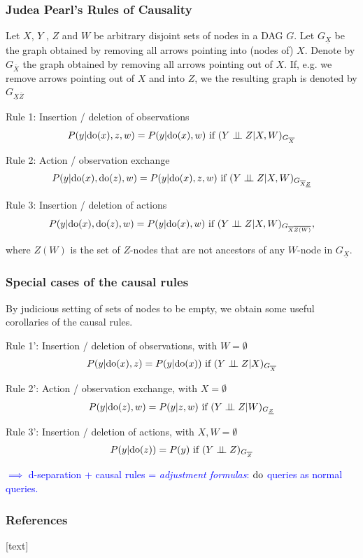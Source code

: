 \begin{frame}
\frametitle{Judea Pearl's Rules of Causality}

Let $X$, $Y$ , $Z$ and $W$ be arbitrary disjoint sets of nodes in a DAG $G$. Let $G_\underline{X}$ be the graph obtained by removing all arrows pointing into (nodes of) $X$.
Denote by $G_{\overline{X}}$ the graph obtained by removing all arrows pointing out of $X$. If, e.g. we remove arrows pointing out of $X$ and into $Z$, we the resulting graph is denoted by $G_{\underline{X} \overline{Z}}$

Rule 1: Insertion / deletion of observations
\begin{equation*}
P(y | \mathrm{do}(x), z, w) = P(y | \mathrm{do}(x), w) \textrm{ if } (Y \perp\!\!\!\perp Z | X, W)_{G_{\overline{X}}}
\end{equation*}

Rule 2: Action / observation exchange
\begin{equation*}
P(y | \mathrm{do}(x), \mathrm{do}(z), w) = P(y | \mathrm{do}(x), z, w) \textrm{ if } (Y \perp\!\!\!\perp Z | X, W)_{G_{\overline{X} \underline{Z}}}
\end{equation*}

Rule 3: Insertion / deletion of actions
\begin{equation*}
P(y | \mathrm{do}(x), \mathrm{do}(z), w) = P(y | \mathrm{do}(x), w) \textrm{ if } (Y \perp\!\!\!\perp Z | X, W)_{G_{\overline{X} \overline{Z(W)}}},
\end{equation*}

where $Z(W)$ is the set of $Z$-nodes that are not ancestors of any $W$-node in $G_\underline{X}$.

\end{frame}


\begin{frame}
\frametitle{Special cases of the causal rules}

By judicious setting of sets of nodes to be empty, we obtain some useful corollaries of the causal rules.
\newline

Rule 1': Insertion / deletion of observations, with $W = \emptyset$
\begin{equation*}
    P(y | \mathrm{do}(x), z) = P(y | \mathrm{do}(x)) \textrm{ if } (Y \perp\!\!\!\perp Z | X)_{G_{\overline{X}}}
\end{equation*}

Rule 2': Action / observation exchange, with $X = \emptyset$
\begin{equation*}
P(y | \mathrm{do}(z), w) = P(y | z, w) \textrm{ if } (Y \perp\!\!\!\perp Z | W)_{G_{ \underline{Z}}}
\end{equation*}

Rule 3': Insertion / deletion of actions, with $X, W = \emptyset$
\begin{equation*}
P(y | \mathrm{do}(z)) = P(y) \textrm{ if } (Y \perp\!\!\!\perp Z )_{G_{\overline{Z}}}
\end{equation*}

\textcolor{blue}{$\implies$ d-separation + causal rules = \emph{adjustment formulas}: $\mathrm{do}$ queries as normal queries.}
\end{frame}


\begin{frame}[allowframebreaks]
    \frametitle{References}
    [text]
    
    
\end{frame}

